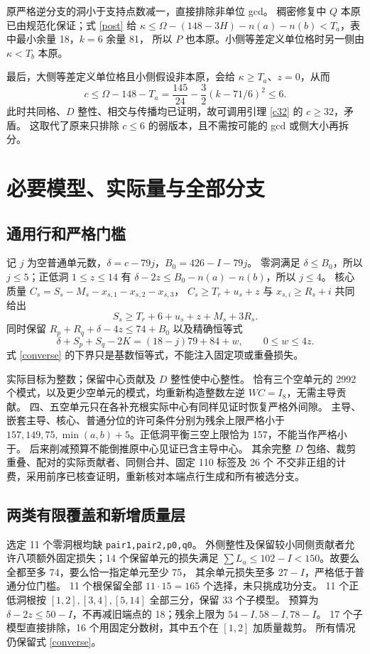 \documentclass[11pt,a4paper]{article}
\theoremstyle{definition}
\begin{document}
原严格逆分支的洞小于支持点数减一，直接排除非单位 gcd。
稠密修复中 $Q$ 本原已由规范化保证；式 \eqref{post} 给
$\kappa\le\Omega-(148-3H)-n(a)-n(b)<T_a$，表中最小余量 18，$k=6$ 余量 81，
所以 $P$ 也本原。小侧等差定义单位格时另一侧由 $\kappa<T_b$ 本原。

最后，大侧等差定义单位格且小侧假设非本原，会给 $\kappa\ge T_a$、$z=0$，从而
\[
 c\le\Omega-148-T_a
 =\frac{145}{24}-\frac32(k-71/6)^2\le6.
\]
此时共同格、$D$ 整性、相交与传播均已证明，故可调用引理 \ref{c32} 的 $c\ge32$，矛盾。
这取代了原来只排除 $c\le6$ 的弱版本，且不需按可能的 gcd 或侧大小再拆分。

\section{必要模型、实际量与全部分支}\label{models}
\subsection{通用行和严格门槛}
记 $j$ 为空普通单元数，$\delta=c-79j$，$B_0=426-I-79j$。
零洞满足 $\delta\le B_0$，所以 $j\le5$；正低洞 $1\le z\le14$ 有
$\delta-2z\le B_0-n(a)-n(b)$，所以 $j\le4$。
核心质量 $C_s=S_s-M_s-x_{s,1}-x_{s,2}-x_{s,3}$，
$C_s\ge T_r+u_s+z$ 与 $x_{s,i}\ge R_s+i$ 共同给出
\[
 S_s\ge T_r+6+u_s+z+M_s+3R_s.
\]
同时保留 $R_p+R_q+\delta-4z\le74+B_0$ 以及精确恒等式
\begin{equation}\label{converse}
 \delta+S_p+S_q-2K=(18-j)79+84+w,\qquad0\le w\le4z.
\end{equation}
式 \eqref{converse} 的下界只是基数恒等式，不能注入固定项或重叠损失。

实际目标为整数；保留中心贡献及 $D$ 整性使中心整性。
恰有三个空单元的 2992 个模式，以及更少空单元的模式，均重新构造整数左逆 $WC=I_8$，无需主导贡献。
四、五空单元只在各补充根实际中心有同样见证时恢复严格外间隙。
主导、嵌套主导、核心、普通分位的许可条件分别为残余上限严格小于
$157,149,75,\min(a,b)+5$。正低洞平衡三空上限恰为 157，不能当作严格小于。
后来削减预算不能倒推原中心见证已含主导中心。
其余完整 $D$ 包络、裁剪重叠、配对的实际贡献者、同侧合并、固定 110 标签及 26 个
不交非正组的计费，采用前序已核查证明，重新核对本端点行生成和所有被选分支。

\subsection{两类有限覆盖和新增质量层}
选定 11 个零洞根均缺 \texttt{pair1,pair2,p0,q0}。
外侧整性及保留较小同侧贡献者允许八项额外固定损失；14 个保留单元的损失满足
$\sum L_u\le102-I<150$。故要么全都至多 74，要么恰一指定单元至少 75，
其余单元损失至多 $27-I$，严格低于普通分位门槛。
11 个根保留全部 $11\cdot15=165$ 个选择，未只挑成功分支。
11 个正低洞根按 $[1,2],[3,4],[5,14]$ 全部三分，保留 33 个子模型。
预算为 $\delta-2z\le50-I$，不再减旧端点的 18；残余上限为 $54-I,58-I,78-I$。
17 个子模型直接排除，16 个用固定分数树，其中五个在 $[1,2]$ 加质量裁剪。
所有情况仍保留式 \eqref{converse}。
\end{document}
